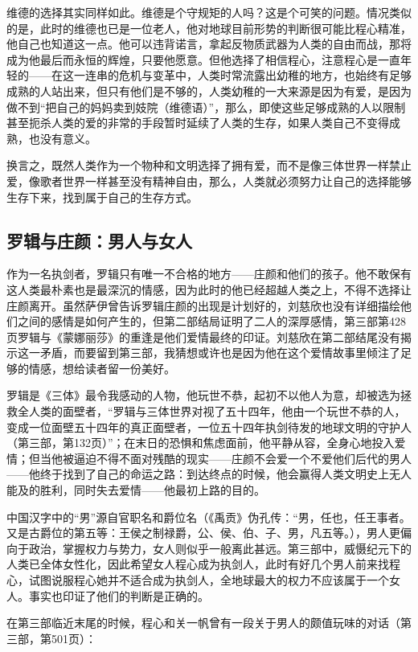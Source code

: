 \documentclass[openany,scheme = chinese, linespread = 1.5]{ctexbook}
\begin{document}
维德的选择其实同样如此。维德是个守规矩的人吗？这是个可笑的问题。情况类似的是，此时的维德也已是一位老人，他对地球目前形势的判断很可能比程心精准，他自己也知道这一点。他可以违背诺言，拿起反物质武器为人类的自由而战，那将成为他最后而永恒的辉煌，只要他愿意。但他选择了相信程心，注意程心是一直年轻的——在这一连串的危机与变革中，人类时常流露出幼稚的地方，也始终有足够成熟的人站出来，但只有他们是不够的，人类幼稚的一大来源是因为有爱，是因为做不到“把自己的妈妈卖到妓院（维德语）”，那么，即使这些足够成熟的人以限制甚至扼杀人类的爱的非常的手段暂时延续了人类的生存，如果人类自己不变得成熟，也没有意义。

换言之，既然人类作为一个物种和文明选择了拥有爱，而不是像三体世界一样禁止爱，像歌者世界一样甚至没有精神自由，那么，人类就必须努力让自己的选择能够生存下来，找到属于自己的生存方式。

\subsection*{罗辑与庄颜：男人与女人}

作为一名执剑者，罗辑只有唯一不合格的地方——庄颜和他们的孩子。他不敢保有这人类最朴素也是最深沉的情感，因为此时的他已经超越人类之上，不得不选择让庄颜离开。虽然萨伊曾告诉罗辑庄颜的出现是计划好的，刘慈欣也没有详细描绘他们之间的感情是如何产生的，但第二部结局证明了二人的深厚感情，第三部第428页罗辑与《蒙娜丽莎》的重逢是他们爱情最终的印证。刘慈欣在第二部结尾没有揭示这一矛盾，而要留到第三部，我猜想或许也是因为他在这个爱情故事里倾注了足够的情感，想给读者留一份美好。

罗辑是《三体》最令我感动的人物，他玩世不恭，起初不以他人为意，却被选为拯救全人类的面壁者，“罗辑与三体世界对视了五十四年，他由一个玩世不恭的人，变成一位面壁五十四年的真正面壁者，一位五十四年执剑待发的地球文明的守护人（第三部，第132页）”；在末日的恐惧和焦虑面前，他平静从容，全身心地投入爱情；但当他被逼迫不得不面对残酷的现实——庄颜不会爱一个不爱他们后代的男人——他终于找到了自己的命运之路：到达终点的时候，他会赢得人类文明史上无人能及的胜利，同时失去爱情——他最初上路的目的。

中国汉字中的“男”源自官职名和爵位名（《禹贡》伪孔传：“男，任也，任王事者。又是古爵位的第五等：王侯之制禄爵，公、侯、伯、子、男，凡五等。），男人更偏向于政治，掌握权力与势力，女人则似乎一般离此甚远。第三部中，威慑纪元下的人类已全体女性化，因此希望女人程心成为执剑人，此时有好几个男人前来找程心，试图说服程心她并不适合成为执剑人，全地球最大的权力不应该属于一个女人。事实也印证了他们的判断是正确的。

在第三部临近末尾的时候，程心和关一帆曾有一段关于男人的颇值玩味的对话（第三部，第501页）：
\end{document}
